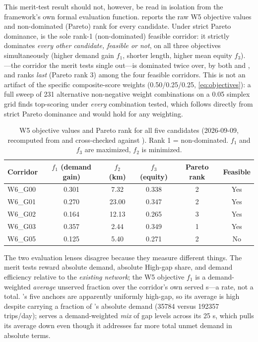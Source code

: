 This merit-test result should not, however, be read in isolation from the framework's own
formal evaluation function.  reports the raw W5 objective values and
non-dominated (Pareto) rank for every candidate. Under strict Pareto dominance,
 is the sole rank-1 (non-dominated) feasible corridor: it strictly dominates
\emph{every other candidate, feasible or not}, on all three objectives simultaneously
(higher demand gain $f_1$, shorter length, higher mean equity $f_3$).
---the corridor the merit tests single out---is dominated twice over,
by both  and , and ranks \emph{last} (Pareto rank 3) among the
four feasible corridors. This is not an artifact of the specific composite-score weights
(\num{0.50}/\num{0.25}/\num{0.25}, \cref{eq:objectives}): a full sweep of \num{231}
alternative non-negative weight combinations on a \num{0.05} simplex grid finds
 top-scoring under \emph{every} combination tested, which follows directly
from strict Pareto dominance and would hold for any weighting.

\begin{table}[htbp]
\centering
\caption{W5 objective values and Pareto rank for all five candidates (2026-09-09,
  recomputed from and cross-checked against ).
  Rank 1 = non-dominated. $f_1$ and $f_3$ are maximized, $f_2$ is minimized.}
\label{tab:pareto-w5}
\begin{tabular}{l S[table-format=1.3] S[table-format=2.2] S[table-format=1.3] c c}
\toprule
Corridor & {$f_1$ (demand gain)} & {$f_2$ (km)} & {$f_3$ (equity)} & Pareto rank & Feasible \\
\midrule
W6\_G00 & 0.301 & 7.32  & 0.338 & 2 & Yes \\
W6\_G01 & 0.270 & 23.00 & 0.347 & 2 & Yes \\
W6\_G02 & 0.164 & 12.13 & 0.265 & 3 & Yes \\
W6\_G03 & 0.357 & 2.44  & 0.349 & 1 & Yes \\
W6\_G05 & 0.125 & 5.40  & 0.271 & 2 & No  \\
\bottomrule
\end{tabular}
\end{table}

The two evaluation lenses disagree because they measure different things.
The merit tests reward absolute demand, absolute High-gap share, and demand efficiency
relative to the \emph{existing network}; the W5 objective $f_1$ is a demand-weighted
\emph{average} unserved fraction over the corridor's own served \ageb{}s---a rate, not a
total. 's five anchors are apparently uniformly high-gap, so its average is
high despite carrying a fraction of 's absolute demand (\num{35784} versus
\num{192357} trips/day);  serves a demand-weighted \emph{mix} of gap levels
across its \num{25} \ageb{}s, which pulls its average down even though it addresses far
more total unmet demand in absolute terms.

